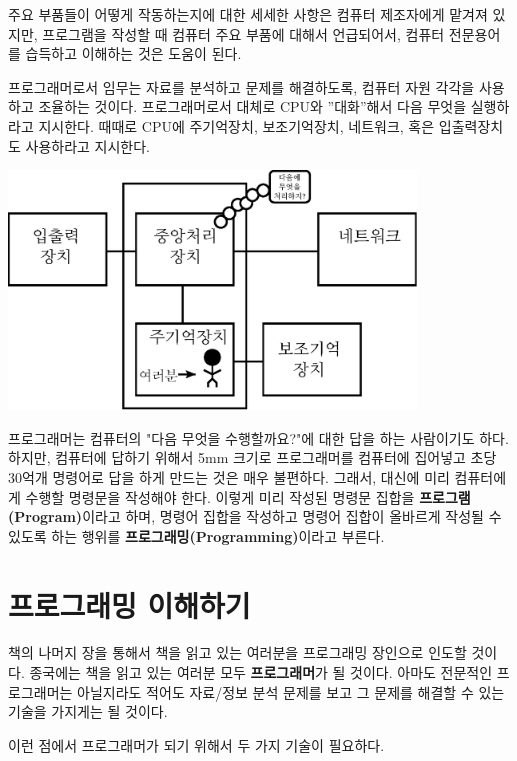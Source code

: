주요 부품들이 어떻게 작동하는지에 대한 세세한 사항은 컴퓨터 제조자에게 맡겨져 있지만, 
프로그램을 작성할 때 컴퓨터 주요 부품에 대해서 언급되어서, 컴퓨터 전문용어를 습득하고 이해하는 것은 도움이 된다.

프로그래머로서 임무는 자료를 분석하고 문제를 해결하도록, 컴퓨터 자원 각각을 사용하고 조율하는 것이다.
프로그래머로서 대체로 CPU와 ''대화''해서 다음 무엇을 실행하라고 지시한다.
때때로 CPU에 주기억장치, 보조기억장치, 네트워크, 혹은 입출력장치도 사용하라고 지시한다.

\beforefig
\centerline{\includegraphics[height=2.50in]{figs2/arch2.eps}}
\afterfig

프로그래머는 컴퓨터의 "다음 무엇을 수행할까요?"에 대한 답을 하는 사람이기도 하다. 
하지만, 컴퓨터에 답하기 위해서 5mm 크기로 프로그래머를 컴퓨터에 집어넣고 초당 30억개 명령어로 답을 하게 만드는 것은 매우 불편하다. 
그래서, 대신에 미리 컴퓨터에게 수행할 명령문을 작성해야 한다. 
이렇게 미리 작성된 명령문 집합을 {\bf 프로그램(Program)}이라고 하며, 
명령어 집합을 작성하고 명령어 집합이 올바르게 작성될 수 있도록 하는 행위를 {\bf 프로그래밍(Programming)}이라고 부른다.

\section{프로그래밍 이해하기}

책의 나머지 장을 통해서 책을 읽고 있는 여러분을 프로그래밍 장인으로 인도할 것이다. 
종국에는 책을 읽고 있는 여러분 모두 {\bf 프로그래머}가 될 것이다. 
아마도 전문적인 프로그래머는 아닐지라도 적어도 자료/정보 분석 문제를 보고 그 문제를 해결할 수 있는 기술을 가지게는 될 것이다.


이런 점에서 프로그래머가 되기 위해서 두 가지 기술이 필요하다.

